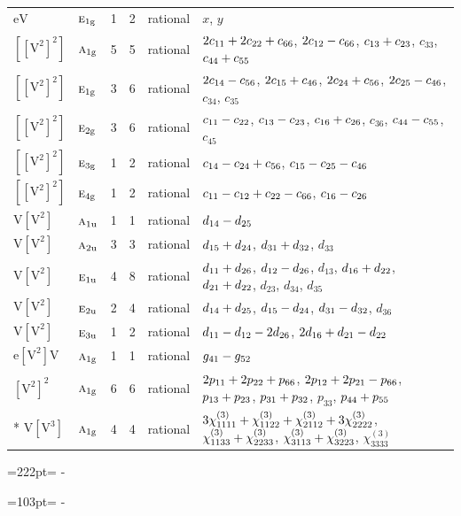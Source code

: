 \documentclass[10pt,a4paper]{article}
\newcommand{\needspace}[1]{\par\penalty-100\begingroup\dimen0=#1\relax\dimen2=\pagegoal
  \advance\dimen2-\pagetotal\ifdim\dimen0>\dimen2\relax\ifdim\dimen2>0pt\vfil\break\fi\fi
  \endgroup}
\numberwithin{equation}{section}
\newcommand{\irr}[1]{\text{\normalfont\scshape #1}}
\newcommand{\ptag}[1]{\mathrm{#1}}
\newcommand{\jahn}[1]{\mathrm{#1}}
\newlength{\fillwidth}\newlength{\cellwidth}\newlength{\colwidth}
\newcommand{\signbreak}{\penalty100\relax}
\begin{document}
{\begin{longtable}{@{}llrrl>{\RaggedRight\arraybackslash}p{\fillwidth}@{}}
$\jahn{eV}$ & $\irr{e}_{1\ptag{g}}$ & 1 & 2 & rational & $x$, $y$\\
$\jahn{[[V^{2}]^{2}]}$ & $\irr{a}_{1\ptag{g}}$ & 5 & 5 & rational & $2c_{11} +\signbreak 2c_{22} +\signbreak c_{66}$, $2c_{12} -\signbreak c_{66}$, $c_{13} +\signbreak c_{23}$, $c_{33}$, $c_{44} +\signbreak c_{55}$\\
$\jahn{[[V^{2}]^{2}]}$ & $\irr{e}_{1\ptag{g}}$ & 3 & 6 & rational & $2c_{14} -\signbreak c_{56}$, $2c_{15} +\signbreak c_{46}$, $2c_{24} +\signbreak c_{56}$, $2c_{25} -\signbreak c_{46}$, $c_{34}$, $c_{35}$\\
$\jahn{[[V^{2}]^{2}]}$ & $\irr{e}_{2\ptag{g}}$ & 3 & 6 & rational & $c_{11} -\signbreak c_{22}$, $c_{13} -\signbreak c_{23}$, $c_{16} +\signbreak c_{26}$, $c_{36}$, $c_{44} -\signbreak c_{55}$, $c_{45}$\\
$\jahn{[[V^{2}]^{2}]}$ & $\irr{e}_{3\ptag{g}}$ & 1 & 2 & rational & $c_{14} -\signbreak c_{24} +\signbreak c_{56}$, $c_{15} -\signbreak c_{25} -\signbreak c_{46}$\\
$\jahn{[[V^{2}]^{2}]}$ & $\irr{e}_{4\ptag{g}}$ & 1 & 2 & rational & $c_{11} -\signbreak c_{12} +\signbreak c_{22} -\signbreak c_{66}$, $c_{16} -\signbreak c_{26}$\\
$\jahn{V[V^{2}]}$ & $\irr{a}_{1\ptag{u}}$ & 1 & 1 & rational & $d_{14} -\signbreak d_{25}$\\
$\jahn{V[V^{2}]}$ & $\irr{a}_{2\ptag{u}}$ & 3 & 3 & rational & $d_{15} +\signbreak d_{24}$, $d_{31} +\signbreak d_{32}$, $d_{33}$\\
$\jahn{V[V^{2}]}$ & $\irr{e}_{1\ptag{u}}$ & 4 & 8 & rational & $d_{11} +\signbreak d_{26}$, $d_{12} -\signbreak d_{26}$, $d_{13}$, $d_{16} +\signbreak d_{22}$, $d_{21} +\signbreak d_{22}$, $d_{23}$, $d_{34}$, $d_{35}$\\
$\jahn{V[V^{2}]}$ & $\irr{e}_{2\ptag{u}}$ & 2 & 4 & rational & $d_{14} +\signbreak d_{25}$, $d_{15} -\signbreak d_{24}$, $d_{31} -\signbreak d_{32}$, $d_{36}$\\
$\jahn{V[V^{2}]}$ & $\irr{e}_{3\ptag{u}}$ & 1 & 2 & rational & $d_{11} -\signbreak d_{12} -\signbreak 2d_{26}$, $2d_{16} +\signbreak d_{21} -\signbreak d_{22}$\\
$\jahn{e[V^{2}]V}$ & $\irr{a}_{1\ptag{g}}$ & 1 & 1 & rational & $\mathnormal{g}_{41} -\signbreak \mathnormal{g}_{52}$\\
$\jahn{[V^{2}]^{2}}$ & $\irr{a}_{1\ptag{g}}$ & 6 & 6 & rational & $2p_{11} +\signbreak 2p_{22} +\signbreak p_{66}$, $2p_{12} +\signbreak 2p_{21} -\signbreak p_{66}$, $p_{13} +\signbreak p_{23}$, $p_{31} +\signbreak p_{32}$, $p_{33}$, $p_{44} +\signbreak p_{55}$\\*
$\jahn{V[V^{3}]}$ & $\irr{a}_{1\ptag{g}}$ & 4 & 4 & rational & $3\chi^{(3)}_{1111} +\signbreak \chi^{(3)}_{1122} +\signbreak \chi^{(3)}_{2112} +\signbreak 3\chi^{(3)}_{2222}$, $\chi^{(3)}_{1133} +\signbreak \chi^{(3)}_{2233}$, $\chi^{(3)}_{3113} +\signbreak \chi^{(3)}_{3223}$, $\chi^{(3)}_{3333}$\\
\bottomrule\end{longtable}}
\needspace{222pt}
\needspace{103pt}
\end{document}
